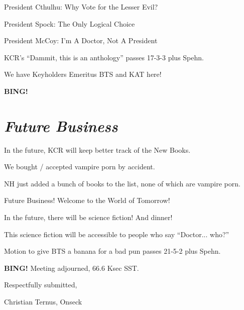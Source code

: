 \documentclass[10pt]{article}
\newcommand{\bing}{{\bf BING!} }
\newcommand{\goto}[1]{\bing \vskip 12pt \section*{{\em{#1}}}}
\newcommand{\ps}{ plus Spehn\xspace}
\begin{document}
President Cthulhu:  Why Vote for the Lesser Evil?

President Spock:  The Only Logical Choice

President McCoy:  I'm A Doctor, Not A President

KCR's ``Dammit, this is an anthology'' passes 17-3-3 \ps.

We have Keyholders Emeritus BTS and KAT here!

\goto{Future Business}

In the future, KCR will keep better track of the New Books.

We bought / accepted vampire porn by accident.

NH just added a bunch of books to the list, none of which are vampire porn.

Future Business!  Welcome to the World of Tomorrow!

In the future, there will be science fiction!  And dinner!  

This science fiction will be accessible to people who say ``Doctor... who?''

Motion to give BTS a banana for a bad pun passes 21-5-2 \ps.

\bing
\noindent
Meeting adjourned, 66.6 Ksec SST.

\vspace{18pt}

\centerline{Respectfully submitted,}
\centerline{Christian Ternus, Onseck}
\end{document}
